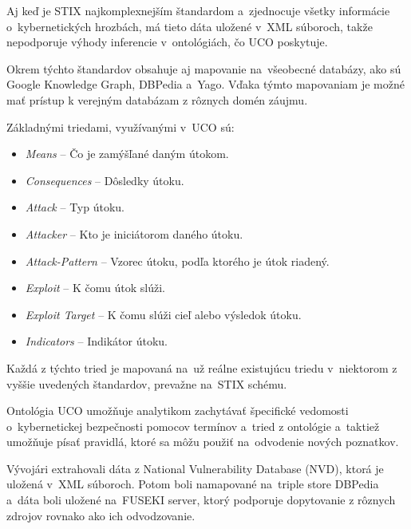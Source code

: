 \documentclass[12pt, a4paper, oneside]{book}
\begin{document}

Aj keď je STIX najkomplexnejším štandardom a~zjednocuje všetky informácie o~kybernetických hrozbách, má tieto dáta uložené v~XML súboroch, takže nepodporuje výhody inferencie v~ontológiách, čo UCO poskytuje.


Okrem týchto štandardov obsahuje aj mapovanie na~všeobecné databázy, ako sú Google Knowledge Graph, DBPedia a~Yago. Vďaka týmto mapovaniam je možné mať prístup k verejným databázam z rôznych domén záujmu.


Základnými triedami, využívanými v~UCO sú: 
\begin{itemize}
\item \textit{Means} -- Čo je zamýšľané daným útokom.
\item \textit{Consequences} -- Dôsledky útoku.
\item \textit{Attack} -- Typ útoku.
\item \textit{Attacker} -- Kto je iniciátorom daného útoku.
\item \textit{Attack-Pattern} -- Vzorec útoku, podľa ktorého je útok riadený.
\item \textit{Exploit} -- K čomu útok slúži.
\item \textit{Exploit Target} -- K čomu slúži cieľ alebo výsledok útoku.
\item \textit{Indicators} -- Indikátor útoku.
\end{itemize}
Každá z týchto tried je mapovaná na~už reálne existujúcu triedu v~niektorom z vyššie uvedených štandardov, prevažne na~STIX schému.


Ontológia UCO umožňuje analytikom zachytávať špecifické vedomosti o~kybernetickej bezpečnosti pomocov termínov a~tried z ontológie a~taktiež umožňuje písať pravidlá, ktoré sa môžu použiť na~odvodenie nových poznatkov.


Vývojári extrahovali dáta z National Vulnerability Database (NVD), ktorá je uložená v~XML súboroch. Potom boli namapované na~triple store DBPedia a~dáta boli uložené na~FUSEKI server, ktorý podporuje dopytovanie z rôznych zdrojov rovnako ako ich odvodzovanie.

\end{document}
